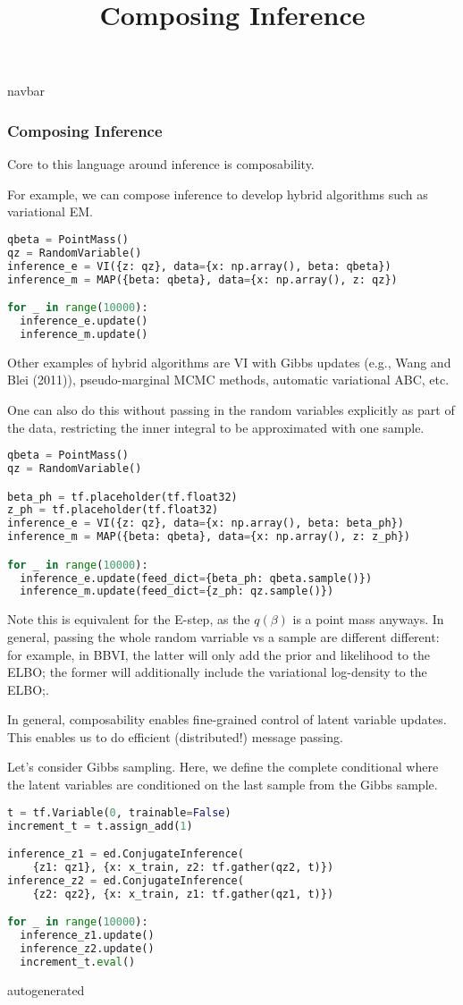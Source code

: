 \title{Composing Inference}

{{navbar}}

\subsubsection{Composing Inference}

Core to this language around inference is composability.

For example, we can compose inference to develop hybrid algorithms
such as variational EM.
\begin{lstlisting}[language=Python]
qbeta = PointMass()
qz = RandomVariable()
inference_e = VI({z: qz}, data={x: np.array(), beta: qbeta})
inference_m = MAP({beta: qbeta}, data={x: np.array(), z: qz})

for _ in range(10000):
  inference_e.update()
  inference_m.update()
\end{lstlisting}
Other examples of hybrid algorithms are VI with Gibbs updates (e.g.,
Wang and Blei (2011)), pseudo-marginal MCMC methods, automatic
variational ABC, etc.

One can also do this without passing in the random variables
explicitly as part of the data, restricting the inner integral to be
approximated with one sample.
\begin{lstlisting}[language=Python]
qbeta = PointMass()
qz = RandomVariable()

beta_ph = tf.placeholder(tf.float32)
z_ph = tf.placeholder(tf.float32)
inference_e = VI({z: qz}, data={x: np.array(), beta: beta_ph})
inference_m = MAP({beta: qbeta}, data={x: np.array(), z: z_ph})

for _ in range(10000):
  inference_e.update(feed_dict={beta_ph: qbeta.sample()})
  inference_m.update(feed_dict={z_ph: qz.sample()})
\end{lstlisting}
Note this is equivalent for the E-step, as the $q(\beta)$ is a point mass
anyways. In general, passing the whole random varriable vs a sample
are different different: for example, in BBVI, the latter will only
add the prior and likelihood to the ELBO; the former will additionally
include the variational log-density to the ELBO;.

In general, composability enables fine-grained control of latent
variable updates. This enables us to do efficient (distributed!)
message passing.

Let's consider Gibbs sampling. Here, we define the complete
conditional where the latent variables are conditioned on the last
sample from the Gibbs sample.
\begin{lstlisting}[language=Python]
t = tf.Variable(0, trainable=False)
increment_t = t.assign_add(1)

inference_z1 = ed.ConjugateInference(
    {z1: qz1}, {x: x_train, z2: tf.gather(qz2, t)})
inference_z2 = ed.ConjugateInference(
    {z2: qz2}, {x: x_train, z1: tf.gather(qz1, t)})

for _ in range(10000):
  inference_z1.update()
  inference_z2.update()
  increment_t.eval()
\end{lstlisting}

{{autogenerated}}
